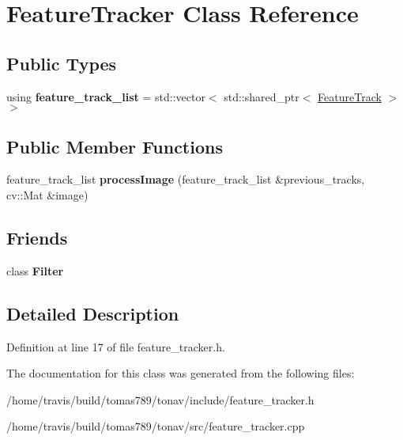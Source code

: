 \hypertarget{class_feature_tracker}{\section{Feature\-Tracker Class Reference}
\label{class_feature_tracker}
}
\subsection*{Public Types}
\begin{DoxyCompactItemize}
\item 
\hypertarget{class_feature_tracker_a8c26ba2ee4c3653c6082a6ceec345f8a}{using {\bfseries feature\-\_\-track\-\_\-list} = std\-::vector$<$ std\-::shared\-\_\-ptr$<$ \hyperlink{class_feature_track}{Feature\-Track} $>$$>$}\label{class_feature_tracker_a8c26ba2ee4c3653c6082a6ceec345f8a}

\end{DoxyCompactItemize}
\subsection*{Public Member Functions}
\begin{DoxyCompactItemize}
\item 
\hypertarget{class_feature_tracker_a1d44cc6cd06ced4f321d2ecebfd7b069}{feature\-\_\-track\-\_\-list {\bfseries process\-Image} (feature\-\_\-track\-\_\-list \&previous\-\_\-tracks, cv\-::\-Mat \&image)}\label{class_feature_tracker_a1d44cc6cd06ced4f321d2ecebfd7b069}

\end{DoxyCompactItemize}
\subsection*{Friends}
\begin{DoxyCompactItemize}
\item 
\hypertarget{class_feature_tracker_a34f7bc7cd29643e53d23b7d500d21739}{class {\bfseries Filter}}\label{class_feature_tracker_a34f7bc7cd29643e53d23b7d500d21739}

\end{DoxyCompactItemize}


\subsection{Detailed Description}


Definition at line 17 of file feature\-\_\-tracker.\-h.



The documentation for this class was generated from the following files\-:\begin{DoxyCompactItemize}
\item 
/home/travis/build/tomas789/tonav/include/feature\-\_\-tracker.\-h\item 
/home/travis/build/tomas789/tonav/src/feature\-\_\-tracker.\-cpp\end{DoxyCompactItemize}
